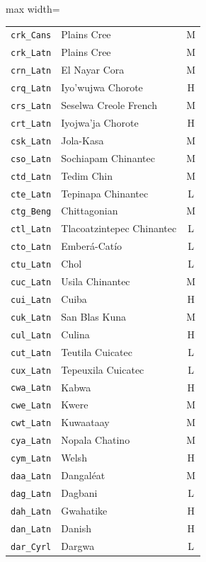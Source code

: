 {\begin{adjustbox}{max width=\textwidth}
\begin{tabular}{llc}
        \texttt{crk\_Cans} & Plains Cree & M \\
        \texttt{crk\_Latn} & Plains Cree & M \\
        \texttt{crn\_Latn} & El Nayar Cora & M \\
        \texttt{crq\_Latn} & Iyo'wujwa Chorote & H \\
        \texttt{crs\_Latn} & Seselwa Creole French & M \\
        \texttt{crt\_Latn} & Iyojwa'ja Chorote & H \\
        \texttt{csk\_Latn} & Jola-Kasa & M \\
        \texttt{cso\_Latn} & Sochiapam Chinantec & M \\
        \texttt{ctd\_Latn} & Tedim Chin & M \\
        \texttt{cte\_Latn} & Tepinapa Chinantec & L \\
        \texttt{ctg\_Beng} & Chittagonian & M \\
        \texttt{ctl\_Latn} & Tlacoatzintepec Chinantec & L \\
        \texttt{cto\_Latn} & Emberá-Catío & L \\
        \texttt{ctu\_Latn} & Chol & L \\
        \texttt{cuc\_Latn} & Usila Chinantec & M \\
        \texttt{cui\_Latn} & Cuiba & H \\
        \texttt{cuk\_Latn} & San Blas Kuna & M \\
        \texttt{cul\_Latn} & Culina & H \\
        \texttt{cut\_Latn} & Teutila Cuicatec & L \\
        \texttt{cux\_Latn} & Tepeuxila Cuicatec & L \\
        \texttt{cwa\_Latn} & Kabwa & H \\
        \texttt{cwe\_Latn} & Kwere & M \\
        \texttt{cwt\_Latn} & Kuwaataay & M \\
        \texttt{cya\_Latn} & Nopala Chatino & M \\
        \texttt{cym\_Latn} & Welsh & H \\
        \texttt{daa\_Latn} & Dangaléat & M \\
        \texttt{dag\_Latn} & Dagbani & L \\
        \texttt{dah\_Latn} & Gwahatike & H \\
        \texttt{dan\_Latn} & Danish & H \\
        \texttt{dar\_Cyrl} & Dargwa & L \\

\end{tabular}
\end{adjustbox}}
